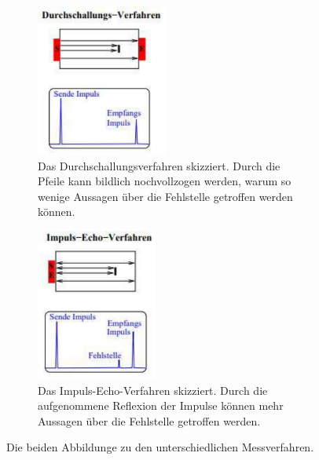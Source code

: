 \begin{figure}
    \begin{subfigure}{0.48\textwidth}
        \centering
        \includegraphics[height=5cm]{content/durchschall.pdf}
        \caption{Das Durchschallungsverfahren skizziert. Durch die Pfeile kann bildlich nochvollzogen 
                werden, warum so wenige Aussagen über die Fehlstelle getroffen werden können.\cite{anleitung}}
        \label{fig:durchschall}
    \end{subfigure}
\hfill 
    \begin{subfigure}{0.48\textwidth}
        \centering
        \includegraphics[height=5cm]{content/impuls_echo.pdf}
        \caption{Das Impuls-Echo-Verfahren skizziert. Durch die aufgenommene Reflexion der Impulse können mehr Aussagen über die Fehlstelle getroffen werden. \cite{anleitung}}
        \label{fig:impuls-echo}
    \end{subfigure}
    \caption{Die beiden Abbildunge zu den unterschiedlichen Messverfahren.}
    \label{fig:messmethoden}
\end{figure}